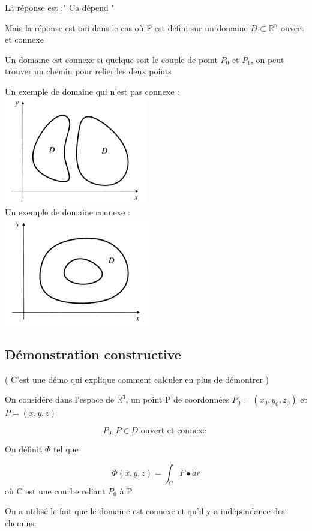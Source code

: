 La réponse est :" Ca dépend "

Mais la réponse est oui dans le cas où F est défini sur un domaine $D\subset \mathbb{R}^n$ ouvert et connexe
\begin{mydef}

Un domaine est connexe si quelque soit le couple de point $P_0$ et $P_1$, on peut trouver un chemin pour relier les deux points
\end{mydef}


Un exemple de domaine qui n'est pas connexe : \\
\includegraphics[scale=1]{image1.png}
\\
Un exemple de domaine connexe :
\\
\includegraphics[scale=1]{image2.png}

\subsection{Démonstration constructive}

( C'est une démo qui explique comment calculer en plus de démontrer )

On considére dans l'espace de $\mathbb{R}^3$, un point P de coordonnées $P_0 = (x_0,y_0,z_0) $  et $P = (x,y,z)$

\[P_0, P \in D \text{ ouvert et connexe }\]

On définit $\Phi$ tel que

\[\Phi (x,y,z ) =\int_C F\bullet dr \]
où C est une courbe reliant $P_0$ à P

On a utilisé le fait que le domaine est connexe et qu'il y a indépendance des chemins.

